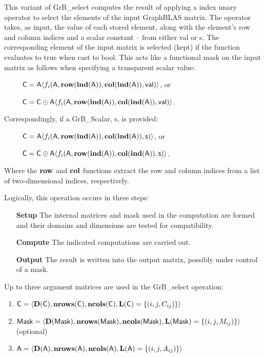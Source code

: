 This variant of {\sf GrB\_select} computes the result of applying a index unary operator
to select the elements of the input GraphBLAS matrix.  The operator takes, as input,
the value of each stored element, along with the element's row and column indices and a scalar 
constant -- from either {\sf val} or {\sf s}.  The corresponding element of the input matrix is selected (kept)
if the function evaluates to {\sf true} when cast to {\sf bool}.  This acts like a
functional mask on the input matrix as follows when specifying a transparent scalar value:
\begin{itemize}[leftmargin=2.1in]
    \item[~] ${\sf C} =               {\sf A}\langle f_{i}({\sf A}, \bold{row}(\bold{ind}({\sf A})), \bold{col}(\bold{ind}({\sf A})), {\sf val})\rangle$, or
    \item[~] ${\sf C} = {\sf C} \odot {\sf A}\langle f_{i}({\sf A}, \bold{row}(\bold{ind}({\sf A})), \bold{col}(\bold{ind}({\sf A})), {\sf val})\rangle$.  
\end{itemize}
Correspondingly, if a {\sf GrB\_Scalar}, {\sf s}, is provided:
\begin{itemize}[leftmargin=2.1in]
\item[~] ${\sf C} =               {\sf A}\langle f_{i}({\sf A}, \bold{row}(\bold{ind}({\sf A})), \bold{col}(\bold{ind}({\sf A})), {\sf s})\rangle$, or
\item[~] ${\sf C} = {\sf C} \odot {\sf A}\langle f_{i}({\sf A}, \bold{row}(\bold{ind}({\sf A})), \bold{col}(\bold{ind}({\sf A})), {\sf s})\rangle$.  
\end{itemize}
Where the $\bold{row}$ and $\bold{col}$ functions extract the row and column indices from a list of two-dimensional indices, respectively.

Logically, this operation occurs in three steps:
\begin{enumerate}[leftmargin=0.85in]
\item[\bf Setup] The internal matrices and mask used in the computation are formed 
and their domains and dimensions are tested for compatibility.
\item[\bf Compute] The indicated computations are carried out.
\item[\bf Output] The result is written into the output matrix, possibly under 
control of a mask.
\end{enumerate}

Up to three argument matrices are used in the {\sf GrB\_select} operation:
\begin{enumerate}
    \item ${\sf C} = \langle \bold{D}({\sf C}),\bold{nrows}({\sf C}),
    \bold{ncols}({\sf C}),\bold{L}({\sf C}) = \{(i,j,C_{ij}) \} \rangle$

    \item ${\sf Mask} = \langle \bold{D}({\sf Mask}),\bold{nrows}({\sf Mask}),
    \bold{ncols}({\sf Mask}),\bold{L}({\sf Mask}) = \{(i,j,M_{ij}) \} \rangle$ (optional)

    \item ${\sf A} = \langle \bold{D}({\sf A}),\bold{nrows}({\sf A}),
    \bold{ncols}({\sf A}),\bold{L}({\sf A}) = \{(i,j,A_{ij}) \} \rangle$
\end{enumerate}

